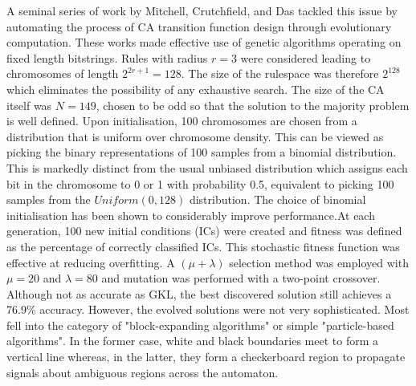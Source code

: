 A seminal series of work by Mitchell, Crutchfield, and Das\cite{mitchell1996evolving} tackled this issue by automating the process of CA transition function design through evolutionary computation. These works made effective use of genetic algorithms operating on fixed length bitstrings. Rules with radius $r = 3$ were considered leading to chromosomes of length $2^{2r+1}=128$. The size of the rulespace was therefore $2^{128}$ which eliminates the possibility of any exhaustive search. The size of the CA itself was $N=149$, chosen to be odd so that the solution to the majority problem is well defined. Upon initialisation, 100 chromosomes are chosen from a distribution that is uniform over chromosome density. This can be viewed as picking the binary representations of 100 samples from a binomial distribution. This is markedly distinct from the usual unbiased distribution which assigns each bit in the chromosome to 0 or 1 with probability 0.5, equivalent to picking 100 samples from the $Uniform(0, 128)$ distribution. The choice of binomial initialisation has been shown to considerably improve performance\cite{mitchell1994evolving}.At each generation, 100 new initial conditions (ICs) were created and fitness was defined as the percentage of correctly classified ICs. This stochastic fitness function was effective at reducing overfitting. A $(\mu+\lambda)$ selection method was employed with $\mu=20$ and $\lambda=80$ and mutation was performed with a two-point crossover. Although not as accurate as GKL, the best discovered solution still achieves a 76.9\% accuracy. However, the evolved solutions were not very sophisticated. Most fell into the category of "block-expanding algorithms" or simple "particle-based algorithms". In the former case, white and black boundaries meet to form a vertical line whereas, in the latter, they form a checkerboard region to propagate signals about ambiguous regions across the automaton.\\

